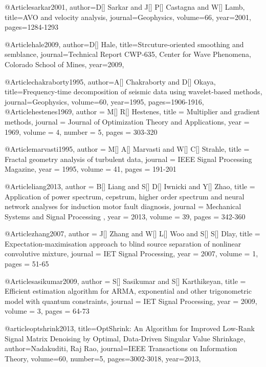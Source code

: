 @Article{sarkar2001,
author={D[] Sarkar and J[] P[] Castagna and W[] Lamb},
title={AVO and velocity analysis},
journal={Geophysics},
volume=66,
year=2001,
pages={1284-1293}
}

@Article{hale2009,
author={D[] Hale},
title={Strcuture-oriented smoothing and semblance},
journal={Technical Report CWP-635, Center for Wave Phenomena, Colorado School of Mines},
year=2009,
}


@Article{chakraborty1995,
author={A[] Chakraborty and D[] Okaya},
title={Frequency-time decomposition of
seismic data using wavelet-based methods},
journal={Geophysics},
volume=60,
year=1995,
pages={1906-1916},
}
@Article{hestenes1969,
  author = 	 {M[] R[] Hestenes},
  title = 	 {Multiplier and gradient methods},
  journal = 	 {Journal of Optimization Theory and Applications},
  year = 	 1969,
  volume = 	 4,
  number = 5,
  pages = 	 {303-320}
}

@Article{marvasti1995,
  author = 	 {M[] A[] Marvasti and W[] C[] Strahle},
  title = 	 {Fractal geometry analysis of turbulent data},
  journal = 	 {IEEE Signal Processing Magazine},
  year = 	 1995,
  volume = 	 41,
  pages = 	 {191-201}
}

@Article{liang2013,
  author = 	 {B[] Liang and S[] D[] Iwnicki and Y[] Zhao},
  title = 	 {Application of power spectrum, cepstrum, higher order spectrum and neural network analyses for induction motor fault diagnosis},
  journal = 	 {Mechanical Systems and Signal Processing },
  year = 	 2013,
  volume = 39,
  pages = 	 {342-360}
}

@Article{zhang2007,
  author = 	 {J[] Zhang and W[] L[] Woo and S[] S[] Dlay},
  title = 	 {Expectation-maximisation approach to blind source separation of nonlinear convolutive mixture},
  journal = 	 {IET Signal Processing},
  year = 	 2007,
  volume = 1,
  pages = 	 {51-65}
}

@Article{sasikumar2009,
  author = 	 {S[] Sasikumar and S[] Karthikeyan},
  title = 	 {Efficient estimation algorithm for ARMA, exponential and other trigonometric model with quantum constraints},
  journal = 	 {IET Signal Processing},
  year = 	 2009,
  volume = 3,
  pages = 	 {64-73}
}






@article{optshrink2013,
  title={OptShrink: An Algorithm for Improved Low-Rank Signal Matrix Denoising by Optimal, Data-Driven Singular Value Shrinkage},
  author={Nadakuditi, Raj Rao},
  journal={IEEE Transactions on Information Theory},
  volume={60},
  number={5},
  pages={3002-3018},
  year={2013},
}

